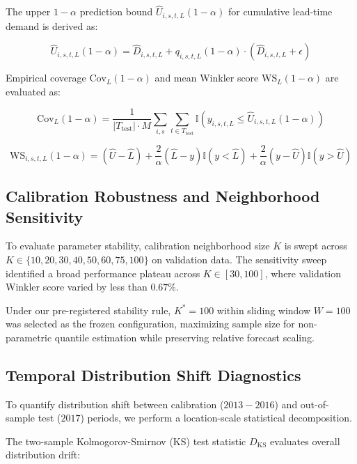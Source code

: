 The upper $1-\alpha$ prediction bound $\hat{U}_{i,s,t,L}(1-\alpha)$ for cumulative lead-time demand is derived as:

\begin{equation}
\hat{U}_{i,s,t,L}(1-\alpha) = \hat{D}_{i,s,t,L} + q_{i,s,t,L}(1-\alpha) \cdot \left( \hat{D}_{i,s,t,L} + \epsilon \right)
\end{equation}

Empirical coverage $\text{Cov}_{L}(1-\alpha)$ and mean Winkler score $\text{WS}_{L}(1-\alpha)$ are evaluated as:

\begin{equation}
\text{Cov}_{L}(1-\alpha) = \frac{1}{|T_{\text{test}}| \cdot M} \sum_{i,s} \sum_{t \in T_{\text{test}}} \mathbb{I} \left( y_{i,s,t,L} \le \hat{U}_{i,s,t,L}(1-\alpha) \right)
\end{equation}

\begin{equation}
\text{WS}_{i,s,t,L}(1-\alpha) = (\hat{U} - \hat{L}) + \frac{2}{\alpha} (\hat{L} - y) \mathbb{I}(y < \hat{L}) + \frac{2}{\alpha} (y - \hat{U}) \mathbb{I}(y > \hat{U})
\end{equation}

\subsection{Calibration Robustness and Neighborhood Sensitivity}
To evaluate parameter stability, calibration neighborhood size $K$ is swept across $K \in \{10, 20, 30, 40, 50, 60, 75, 100\}$ on validation data. The sensitivity sweep identified a broad performance plateau across $K \in [30, 100]$, where validation Winkler score varied by less than $0.67\%$. 

Under our pre-registered stability rule, $K^*=100$ within sliding window $W=100$ was selected as the frozen configuration, maximizing sample size for non-parametric quantile estimation while preserving relative forecast scaling.

\subsection{Temporal Distribution Shift Diagnostics}
To quantify distribution shift between calibration ($2013-2016$) and out-of-sample test ($2017$) periods, we perform a location-scale statistical decomposition. 

The two-sample Kolmogorov-Smirnov (KS) test statistic $D_{\text{KS}}$ evaluates overall distribution drift:


